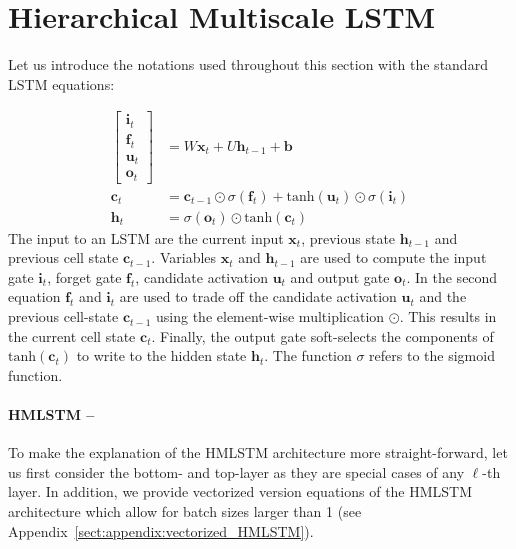 \section{Hierarchical Multiscale LSTM}

Let us introduce the notations used throughout this section with the standard LSTM equations:

\begin{align}
    \tag{gates and candidate}
     \begin{bmatrix}
               \mathbf{i}_{t} \\
               \mathbf{f}_{t} \\
               \mathbf{u}_{t} \\
               \mathbf{o}_t
      \end{bmatrix} &= W\mathbf{x}_t + U\mathbf{h}_{t-1} + \mathbf{b}  \\
             \tag{cell state}
             \mathbf{c}_t &= \mathbf{c}_{t-1} \odot \sigma (\mathbf{f}_t) + \text{tanh}(\mathbf{u}_t) \odot \sigma (\mathbf{i}_t) \\
             \tag{hidden state}
             \mathbf{h}_t &= \sigma (\mathbf{o}_t) \odot \text{tanh}(\mathbf{c}_t) 
\end{align}
The input to an LSTM are the current input $\mathbf{x}_t$, previous state $\mathbf{h}_{t-1}$ and previous 
cell state $\mathbf{c}_{t-1}$. Variables $\mathbf{x}_t$ and 
$\mathbf{h}_{t-1}$ are used to compute the input gate 
$\mathbf{i}_t$,
forget gate $\mathbf{f}_t$, candidate activation $\mathbf{u}_t$ 
and output gate $\mathbf{o}_t$. 
In the second equation $\mathbf{f}_t$ and $\mathbf{i}_t$ are used to trade off the 
candidate activation $\mathbf{u}_t$ and the previous cell-state $\mathbf{c}_{t-1}$ using the element-wise multiplication $\odot$. 
This results in the current cell state
$\mathbf{c}_t$. Finally, the output gate soft-selects the 
components of $\text{tanh}(\mathbf{c}_t)$ to write to the hidden state $\mathbf{h}_t$. The function $\sigma$ refers to the sigmoid function.

\paragraph{HMLSTM --} To make the explanation of the HMLSTM architecture more straight-forward, let us first consider the bottom- and top-layer as 
they are special cases of any $\ell$-th layer. 
In addition, we provide vectorized version equations of the HMLSTM architecture which allow for batch sizes larger than 1 (see Appendix~\ref{sect:appendix:vectorized_HMLSTM}).

